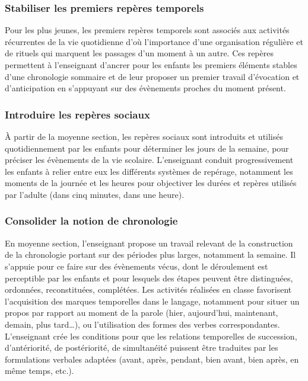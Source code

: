 \subsubsection{Stabiliser les premiers repères temporels}
Pour les plus jeunes, les premiers repères temporels sont associés aux activités récurrentes de la vie quotidienne d’où l’importance d’une organisation régulière et de rituels qui marquent les passages d’un moment à un autre. Ces repères permettent à l’enseignant d’\og ancrer \fg{} pour les enfants les premiers éléments stables d’une chronologie sommaire et de leur proposer un premier travail d’évocation et d’anticipation en s’appuyant sur des évènements proches du moment présent.

\subsubsection{Introduire les repères sociaux}
À partir de la moyenne section, les repères sociaux sont introduits et utilisés quotidiennement par les enfants pour déterminer les jours de la semaine, pour préciser les évènements de la vie scolaire. L’enseignant conduit progressivement les enfants à relier entre eux les différents systèmes de repérage, notamment les moments de la journée et les heures pour objectiver les durées et repères utilisés par l’adulte (dans cinq minutes, dans une heure). 

\subsubsection{Consolider la notion de chronologie}
En moyenne section, l’enseignant propose un travail relevant de la construction de la chronologie portant sur des périodes plus larges, notamment la semaine. Il s’appuie pour ce faire sur des évènements vécus, dont le déroulement est perceptible par les enfants et pour lesquels des étapes peuvent être distinguées, ordonnées, reconstituées, complétées. Les activités réalisées en classe favorisent l’acquisition des marques temporelles dans le langage, notamment pour situer un propos par rapport au moment de la parole (hier, aujourd’hui, maintenant, demain, plus tard\dots), ou l’utilisation des formes des verbes correspondantes. L’enseignant crée les conditions pour que les relations temporelles de succession, d’antériorité, de postériorité, de simultanéité puissent être traduites par les formulations verbales adaptées (avant, après, pendant, bien avant, bien après, en même temps, etc.). 

